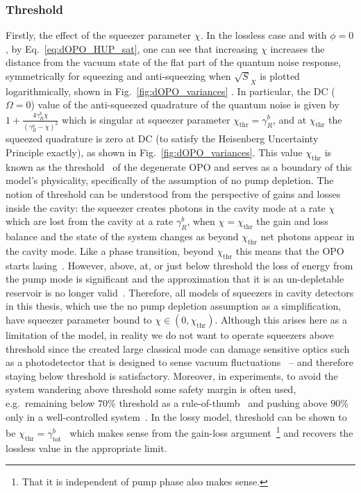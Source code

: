 \subsubsection{Threshold}
Firstly, the effect of the squeezer parameter $\chi$. In the lossless case and with $\phi=0$, by Eq.~\ref{eq:dOPO_HUP_sat}, one can see that increasing $\chi$ increases the distance from the vacuum state of the flat part of the quantum noise response, symmetrically for squeezing and anti-squeezing when $\sqrt S_X$ is plotted logarithmically, shown in Fig.~\ref{fig:dOPO_variances} . In particular, the DC ($\Omega=0$) value of the anti-squeezed quadrature of the quantum noise is given by $1+\frac{4 \gamma^b_R \chi}{\left(\gamma^b_R-\chi\right)^2}$ which is singular at squeezer parameter $\chi_\text{thr}=\gamma^b_R$, and at $\chi_\text{thr}$ the squeezed quadrature is zero at DC (to satisfy the Heisenberg Uncertainty Principle exactly), as shown in Fig.~\ref{fig:dOPO_variances}. This value $\chi_\text{thr}$ is known as the threshold~\cite{} of the degenerate OPO and serves as a boundary of this model's physicality, specifically of the assumption of no pump depletion. The notion of threshold can be understood from the perspective of gains and losses inside the cavity: the squeezer creates photons in the cavity mode at a rate $\chi$ which are lost from the cavity at a rate $\gamma^b_R$, when $\chi=\chi_\text{thr}$ the gain and loss balance and the state of the system changes as beyond $\chi_\text{thr}$ net photons appear in the cavity mode. Like a phase transition, beyond $\chi_\text{thr}$ this means that the OPO starts lasing~\cite{}. However, above, at, or just below threshold the loss of energy from the pump mode is significant and the approximation that it is an un-depletable reservoir is no longer valid~\cite{}. Therefore, all models of squeezers in cavity detectors in this thesis, which use the no pump depletion assumption as a simplification, have squeezer parameter bound to $\chi\in(0,\chi_\text{thr})$. %
Although this arises here as a limitation of the model, in reality we do not want to operate squeezers above threshold since the created large classical mode can damage sensitive optics such as a photodetector that is designed to sense vacuum fluctuations~\cite{} -- and therefore staying below threshold is satisfactory. Moreover, in experiments, to avoid the system wandering above threshold some safety margin is often used, e.g.\ remaining below $70\%$ threshold as a rule-of-thumb~\cite{} and pushing above $90\%$ only in a well-controlled system~\cite{}. In the lossy model, threshold can be shown to be $\chi_\text{thr}=\gamma^b_\text{tot}$~\cite{} which makes sense from the gain-loss argument~\footnote{That it is independent of pump phase also makes sense.} and recovers the lossless value in the appropriate limit. %

